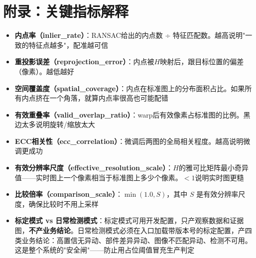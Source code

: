\documentclass[12pt,a4paper]{ctexart}
\begin{document}
\section{附录：关键指标解释}

\begin{itemize}
\item \textbf{内点率（inlier\_rate）}：RANSAC给出的内点数 ÷ 特征匹配数。越高说明"一致的特征点越多"，配准越可信
\item \textbf{重投影误差（reprojection\_error）}：内点被$H$映射后，跟目标位置的偏差（像素）。越低越好
\item \textbf{空间覆盖度（spatial\_coverage）}：内点在标准图上的分布面积占比。如果所有内点挤在一个角落，就算内点率很高也可能配错
\item \textbf{有效重叠率（valid\_overlap\_ratio）}：warp后有效像素占标准图的比例。黑边太多说明旋转/缩放太大
\item \textbf{ECC相关性（ecc\_correlation）}：微调后两图的全局相关程度。越高说明微调更成功
\item \textbf{有效分辨率尺度（effective\_resolution\_scale）}：$H$的雅可比矩阵最小奇异值——实时图上一个像素相当于标准图上多少个像素。$<1$说明实时图更糙
\item \textbf{比较倍率（comparison\_scale）}：$\min(1.0, S)$，其中 $S$ 是有效分辨率尺度，确保比较时不用上采样

\item \textbf{标定模式 vs 日常检测模式}：标定模式可用开发配置，只产观察数据和证据图，\textbf{不产业务结论}。日常检测模式必须在入口加载带版本号的标定配置，产四类业务结论：高置信无异动、部件差异异动、图像不匹配异动、检测不可用。这是整个系统的"安全闸"——防止用占位阈值冒充生产判定
\end{itemize}
\end{document}
